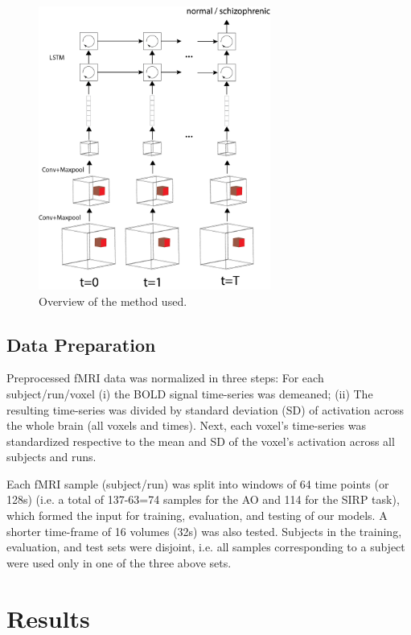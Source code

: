 \documentclass{article}
\begin{document}
\begin{figure}[t]
\begin{center}
\includegraphics[width=3in]{figures/overview.png}
\end{center}
\caption{Overview of the method used.}
\label{fig1}
\end{figure}

\subsection{Data Preparation}

Preprocessed fMRI data was normalized in three steps: For each subject/run/voxel (i) the BOLD signal time-series was demeaned; (ii) The resulting time-series was divided by standard deviation (SD) of activation across the whole brain (all voxels and times). Next, each voxel's time-series was standardized respective to the mean and SD of the voxel's activation across all subjects and runs.

Each fMRI sample (subject/run) was split into windows of 64 time points (or 128s) (i.e. a total of 137-63=74 samples for the AO and 114 for the SIRP task), which formed the input for training, evaluation, and testing of our models. A shorter time-frame of 16 volumes (32s) was also tested. Subjects in the training, evaluation, and test sets were disjoint, i.e. all samples corresponding to a subject were used only in one of the three above sets.

\section*{Results}
\end{document}
